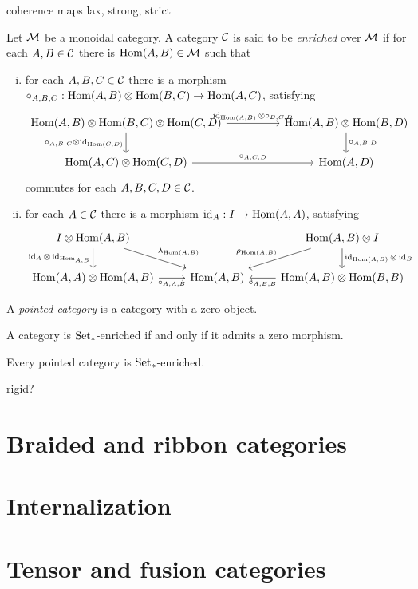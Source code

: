 \documentclass{../../large}
\begin{document}
\begin{prb}
coherence maps
lax, strong, strict
\end{prb}




\begin{prb}
Let $\mathcal{M}$ be a monoidal category.
A category $\mathcal{C}$ is said to be \emph{enriched} over $\mathcal{M}$ if for each $A,B\in\mathcal{C}$ there is $\operatorname{Hom}(A,B)\in\mathcal{M}$ such that
\begin{enumerate}[(i)]
\item for each $A,B,C\in\mathcal{C}$ there is a morphism $\circ_{A,B,C}:\operatorname{Hom}(A,B)\otimes\operatorname{Hom}(B,C)\to\operatorname{Hom}(A,C)$, satisfying
\[\begin{tikzcd}[column sep=huge]
\Hom(A,B)\otimes\Hom(B,C)\otimes\Hom(C,D) \rar{\id_{\Hom(A,B)}\otimes\circ_{B,C,D}} \dar[swap]{\circ_{A,B,C}\otimes\id_{\Hom(C,D)}} &
\Hom(A,B)\otimes\Hom(B,D) \dar{\circ_{A,B,D}} \\
\Hom(A,C)\otimes\Hom(C,D) \rar{\circ_{A,C,D}} &
\Hom(A,D)
\end{tikzcd}\]
commutes for each $A,B,C,D\in\mathcal{C}$.
\item for each $A\in\mathcal{C}$ there is a morphism $\operatorname{id}_A:I\to\operatorname{Hom}(A,A)$, satisfying
\[\begin{tikzcd}
I\otimes\Hom(A,B) \dar[swap]{\id_A\otimes\id_{\Hom_{A,B}}} \ar{dr}{\lambda_{\Hom(A,B)}} &&
\Hom(A,B)\otimes I \ar[swap]{dl}{\rho_{\Hom(A,B)}} \dar{\id_{\Hom(A,B)}\otimes\id_B}\\
\Hom(A,A)\otimes\Hom(A,B) \rar[swap]{\circ_{A,A,B}} &
\Hom(A,B)  &
\Hom(A,B)\otimes\Hom(B,B) \lar{\circ_{A,B,B}}
\end{tikzcd}\]
\end{enumerate}
\end{prb}

\begin{prb}
A \emph{pointed category} is a category with a zero object.
\begin{parts}
\item A category is $\mathrm{Set}_*$-enriched if and only if it admits a zero morphism.
\item Every pointed category is $\mathrm{Set}_*$-enriched.
\end{parts}
\end{prb}

rigid?

\section{Braided and ribbon categories}





\section{Internalization}


\section{Tensor and fusion categories}
\end{document}
